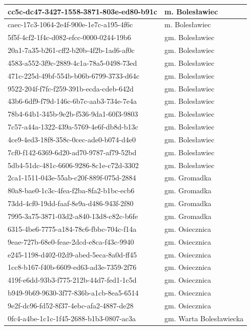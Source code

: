 \begin{table}[]
{\begin{tabular}{|l|l|}
cc5c-dc47-3427-1558-3871-803e-ed80-b91c & m. Bolesławiec \\ \hline
caec-17c3-1064-2e4f-900e-1e7c-a195-4f6c & m. Bolesławiec \\ \hline
5f5f-4cf2-1f4c-d082-efcc-0000-0244-19b6 & gm. Bolesławiec \\ \hline
20a1-7a35-b261-cff2-b20b-4f2b-1ad6-af0c & gm. Bolesławiec \\ \hline
4583-a552-3f9c-2889-4c1a-78a5-0498-73ed & gm. Bolesławiec \\ \hline
471c-225d-49bf-554b-b06b-6799-3733-d64c & gm. Bolesławiec \\ \hline
9522-204f-f7fc-f259-391b-ecda-cdeb-642d & gm. Bolesławiec \\ \hline
43b6-6df9-f79d-146c-6b7c-aab3-734e-7e4a & gm. Bolesławiec \\ \hline
78b4-64b1-345b-9e2b-f536-9da1-60f3-9803 & gm. Bolesławiec \\ \hline
7c57-a44a-1322-439a-5769-4e6f-db8d-b13c & gm. Bolesławiec \\ \hline
4ce9-4ed3-18f8-358c-0cec-ade0-b074-d4e0 & gm. Bolesławiec \\ \hline
7cf0-f142-6369-6d20-ad70-9787-af79-52bd & gm. Bolesławiec \\ \hline
5db4-51dc-481c-6606-9286-8c1e-c72d-3302 & gm. Bolesławiec \\ \hline
2ca1-1511-043e-55ab-c20f-889f-075d-2884 & gm. Gromadka \\ \hline
80a8-bae0-1c3c-4fea-f2ba-8fa2-b1bc-ecb6 & gm. Gromadka \\ \hline
73dd-4cf0-19dd-faaf-8e9a-d486-943f-2f80 & gm. Gromadka \\ \hline
7995-3a75-3871-03d2-a840-13d8-c82c-b6fe & gm. Gromadka \\ \hline
6315-4be6-7775-a184-78c6-fbbc-704c-f14a & gm. Osiecznica \\ \hline
9eae-727b-68e0-feae-2dcd-e8ca-f43c-9940 & gm. Osiecznica \\ \hline
e245-1198-d402-02d9-abed-5eca-8a0d-ff45 & gm. Osiecznica \\ \hline
1cc8-b167-f40b-6609-ed63-ad3e-7359-2f76 & gm. Osiecznica \\ \hline
419f-e6dd-93b3-f775-212b-44d7-fed1-1c5d & gm. Osiecznica \\ \hline
b949-9b69-9630-3f77-836b-a1cb-8ea5-6514 & gm. Osiecznica \\ \hline
9e2f-dc96-fd52-8f37-4ebc-afa2-4887-de28 & gm. Osiecznica \\ \hline
0fc4-a4be-1c1c-1f45-2688-b1b3-0807-ac3a & gm. Warta Bolesławiecka \\ \hline

\end{tabular}}
\end{table}
